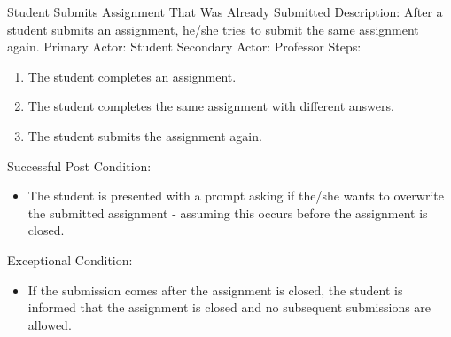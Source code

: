     \begin{section}{Student Submits Assignment That Was Already Submitted}
        Description: After a student submits an assignment, he/she tries to submit the same assignment again. \newline
        Primary Actor: Student \newline
        Secondary Actor: Professor \newline
        Steps:
        \begin{enumerate}
            \item{The student completes an assignment.}
            \item{The student completes the same assignment with different answers.}
            \item{The student submits the assignment again.}
        \end{enumerate}
        Successful Post Condition:
        \begin{itemize}
            \item{The student is presented with a prompt asking if the/she wants to overwrite the submitted assignment - assuming this occurs before the assignment is closed.} 
        \end{itemize}
        Exceptional Condition:
        \begin{itemize}
            \item{If the submission comes after the assignment is closed, the student is informed that the assignment is closed and no subsequent submissions are allowed.} 
        \end{itemize}
    \end{section}
    
